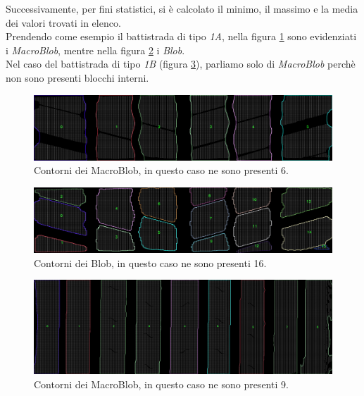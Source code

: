 \noindent Successivamente, per fini statistici, si è calcolato il minimo, il massimo e la media dei valori trovati in elenco.\\
\newline
Prendendo come esempio il battistrada di tipo \textit{1A}, nella figura \ref{fig:batt_1a_analisi_mb} sono evidenziati i \textit{MacroBlob}, mentre nella figura \ref{fig:batt_1a_analisi_b} i \textit{Blob}.\\
Nel caso del battistrada di tipo \textit{1B} (figura \ref{fig:batt_1b_analisi_mb}), parliamo solo di \textit{MacroBlob} perchè non sono presenti blocchi interni.\\

\begin{figure}[H]
	\centering
	\includegraphics[width=0.9\columnwidth]{./pictures/batt_1a_analisi_mb.png}
	\caption{Contorni dei MacroBlob, in questo caso ne sono presenti 6.}\label{fig:batt_1a_analisi_mb}
\end{figure}

\begin{figure}[H]
	\centering
	\includegraphics[width=0.9\columnwidth]{./pictures/batt_1a_analisi_b.png}
	\caption{Contorni dei Blob, in questo caso ne sono presenti 16.}\label{fig:batt_1a_analisi_b}
\end{figure}

\begin{figure}[H]
	\centering
	\includegraphics[width=0.9\columnwidth]{./pictures/batt_1b_analisi_mb.png}
	\caption{Contorni dei MacroBlob, in questo caso ne sono presenti 9.}\label{fig:batt_1b_analisi_mb}
\end{figure}


